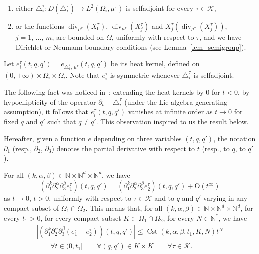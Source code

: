 \documentclass[AHL,Unicode,published]{cedram}
\newcommand*\N{\mathbb{N}}
\newcommand{\calK}{\mathcal{K}}
\newcommand{\rmO}{\mathrm{O}}
\DeclareMathOperator{\Cst}{Cst}
\DeclareMathOperator{\divl}{div}
\renewcommand{\leq}{\leqslant}
\newcommand*{\Allphenumi}{\renewcommand*{\theenumi}{{\Alph{enumi}$_\tau$}}}
\let\oldforall\forall
\renewcommand*{\forall}{\mathrel{\oldforall}}
\begin{document}
\begin{enumerate}\Allphenumi
\item  either $\triangle_i^{\tau} :D(\triangle^{\tau}_i)\rightarrow L^2(\Omega_i,\mu^\tau)$ is selfadjoint for every $\tau\in\calK$,\label{caseAtau}
\item  or the functions $\divl_{\mu^\tau}(X_0^\tau)$, $\divl_{\mu^{\tau}}(X_j^\tau)$ and $X_j^\tau(\divl_{\mu^{\tau}}(X_j^\tau))$, $j=1,\,\ldots,\,m$, are bounded on $\Omega$, uniformly with respect to $\tau$, and we have Dirichlet or Neumann boundary conditions (see Lemma~\ref{lem_semigroup}).\label{caseBtau}
\end{enumerate}

Let $e^\tau_i(t,q,q')=e_{\triangle^\tau_i,\,\mu^\tau}(t,q,q')$ be its heat kernel, defined on $(0,+\infty) \times\Omega_i\times\Omega_i$. Note that $e^\tau_i$ is symmetric whenever $\triangle^\tau_i$ is selfadjoint.

The following fact was noticed in~\cite{Je-Sa-86}: extending the heat kernels by $0$ for $t<0$, by hypoellipticity of the operator $\partial_t-\triangle^\tau_i$ (under the Lie algebra generating assumption), it follows that $e^\tau_i(t,q,q')$ vanishes at infinite order as $t\rightarrow 0$ for fixed $q$ and $q'$ such that $q\neq q'$. This observation inspired to us the result below.

Hereafter, given a function $e$ depending on three variables $(t,q,q')$, the notation $\partial_1$ (resp., $\partial_2$, $\partial_3$) denotes the partial derivative with respect to $t$ (resp., to $q$, to $q'$).


\begin{theo}\label{theo:localheat}
For all $(k,\alpha,\beta)\in \N\times\N^d\times\N^d$, we have
\[
\left(\partial_1^k \partial_2^\alpha \partial_3^\beta e^\tau_1\right) (t,q,q') = \left(\partial_1^k \partial_2^\alpha \partial_3^\beta e^\tau_2\right) (t,q,q') + \rmO(t^\infty)
\]
as $t\rightarrow 0$, $t>0$, uniformly with respect to $\tau\in\calK$ and to $q$ and $q'$ varying in any compact subset of $\Omega_1\cap \Omega_2$. This means that, for all $(k,\alpha,\beta)\in \N\times\N^d\times\N^d$, for every $t_1>0$, for every compact subset $K\subset\Omega_1\cap\Omega_2$, for every $N\in\N^*$, we have
\begin{multline*}
\left\vert \left(\partial_1^k \partial_2^\alpha \partial_3^\beta \left(e^\tau_1 - e^\tau_2\right)\right) (t,q,q') \right\vert \leq \Cst(k,\alpha,\beta,t_1,K,N) t^N \\
\qquad \forall t\in(0,t_1]\qquad\forall (q,q')\in K\times K\qquad\forall \tau\in\calK.
\end{multline*}
\end{theo}
\end{document}
